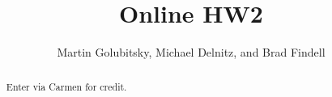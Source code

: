 \documentclass[numbers,nooutcomes,twoside,hints]{xourse}
\title{Online HW2}
\author{Martin Golubitsky, Michael Delnitz, and Brad Findell}
\begin{document}
\begin{abstract}
Enter via Carmen for credit. 
\end{abstract}
\maketitle


\end{document}
